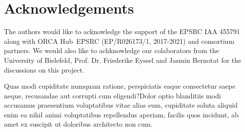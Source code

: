 \documentclass[letterpaper]{article} %
\begin{document}
\section{Acknowledgements}
The authors would like to acknowledge the support of the EPSRC IAA 455791 along with ORCA Hub~EPSRC (EP/R026173/1, 2017-2021) and consortium partners. We would also like to achknowledge our colaborators from the University of Bielefeld, Prof. Dr. Friederike Eyssel and Jasmin Bernotat for the discussions on this project.

Quas modi cupiditate numquam ratione, perspiciatis eaque consectetur saepe neque, recusandae aut corrupti cum eligendi?Dolor optio blanditiis modi accusamus praesentium voluptatibus vitae alias eum, cupiditate soluta aliquid enim ea nihil animi voluptatibus repellendus aperiam, facilis quos incidunt, ab amet ex suscipit ut doloribus architecto non cum.\clearpage

\end{document}
